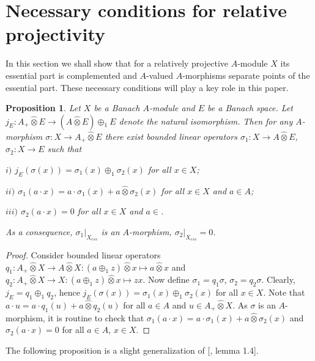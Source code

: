 \documentclass[12pt]{article}
\newtheorem{proposition}[theorem]{Proposition}
\newcommand{\projtens}{\mathbin{\widehat{\otimes}}}
\begin{document}

\section{Necessary conditions for relative projectivity}
\label{NecessaryConditions}

In this section we shall show that for a relatively projective $A$-module $X$ its essential part is complemented and $A$-valued $A$-morphisms separate points of the essential part. These necessary conditions will play a key role in this paper.

\begin{proposition}\label{MorphDecomp} Let $X$ be a Banach $A$-module and $E$ be a Banach space. Let $j_E:A_+\projtens E\to (A\projtens E)\oplus_1 E$ denote the natural isomorphism. Then for any $A$-morphism $\sigma:X\to A_+\projtens E$ there exist bounded linear operators $\sigma_1:X\to A\projtens E$, $\sigma_2:X\to E$ such that

    $i)$ $j_E(\sigma(x))=\sigma_1(x)\oplus_1 \sigma_2(x)$ for all $x\in X$;

    $ii)$ $\sigma_1(a\cdot x)=a\cdot \sigma_1(x)+a\projtens \sigma_2(x)$ for all $x\in X$ and $a\in A$;

    $iii)$ $\sigma_2(a\cdot x)=0$ for all $x\in X$ and $a\in $.

    \noindent
    As a consequence, $\sigma_1|_{X_{ess}}$ is an $A$-morphism, $\sigma_2|_{X_{ess}}=0$.

\end{proposition}
\begin{proof} Consider bounded linear operators
    $q_1:A_+\projtens X\to A\projtens X: (a\oplus_1 z)\projtens x\mapsto a\projtens x$ and
    $q_2:A_+\projtens X\to X: (a\oplus_1 z)\projtens x\mapsto z x$. Now define $\sigma_1=q_1\sigma$, $\sigma_2=q_2\sigma$. Clearly, $j_E=q_1\oplus_1 q_2$, hence $j_E(\sigma(x))=\sigma_1(x)\oplus_1 \sigma_2(x)$ for all $x\in X$. Note that $a\cdot u=a\cdot q_1(u)+a\projtens q_2(u)$ for all $a\in A$ and $u\in A_+\projtens X$. As $\sigma$ is an $A$-morphism, it is routine to check that $\sigma_1(a\cdot x)=a\cdot \sigma_1(x)+a\projtens \sigma_2(x)$ and $\sigma_2(a\cdot x)=0$ for all $a\in A$, $x\in X$.
\end{proof}

The following proposition is a slight generalization of [\cite{SelivBiprojBanAlg}, lemma 1.4].
\end{document}
